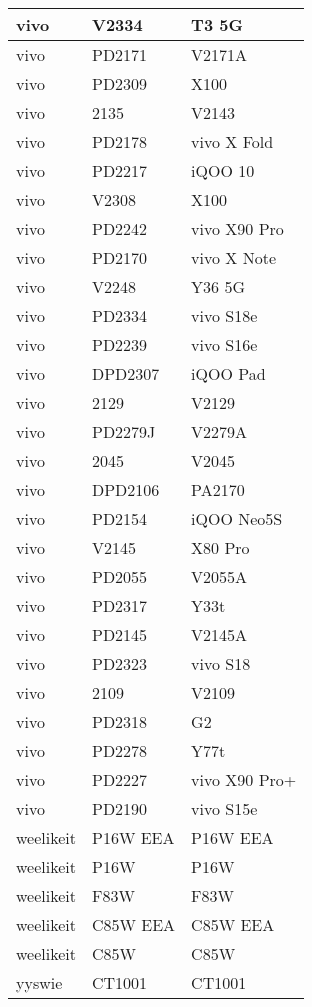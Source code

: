 \begin{tabularx}{\linewidth}{|l|X|X|}
        vivo & V2334 & T3 5G \\ \hline
        vivo & PD2171 & V2171A \\ \hline
        vivo & PD2309 & X100 \\ \hline
        vivo & 2135 & V2143 \\ \hline
        vivo & PD2178 & vivo X Fold \\ \hline
        vivo & PD2217 & iQOO 10 \\ \hline
        vivo & V2308 & X100 \\ \hline
        vivo & PD2242 & vivo X90 Pro \\ \hline
        vivo & PD2170 & vivo X Note \\ \hline
        vivo & V2248 & Y36 5G \\ \hline
        vivo & PD2334 & vivo S18e \\ \hline
        vivo & PD2239 & vivo S16e \\ \hline
        vivo & DPD2307 & iQOO Pad \\ \hline
        vivo & 2129 & V2129 \\ \hline
        vivo & PD2279J & V2279A \\ \hline
        vivo & 2045 & V2045 \\ \hline
        vivo & DPD2106 & PA2170 \\ \hline
        vivo & PD2154 & iQOO Neo5S \\ \hline
        vivo & V2145 & X80 Pro \\ \hline
        vivo & PD2055 & V2055A \\ \hline
        vivo & PD2317 & Y33t \\ \hline
        vivo & PD2145 & V2145A \\ \hline
        vivo & PD2323 & vivo S18 \\ \hline
        vivo & 2109 & V2109 \\ \hline
        vivo & PD2318 & G2 \\ \hline
        vivo & PD2278 & Y77t \\ \hline
        vivo & PD2227 & vivo X90 Pro+ \\ \hline
        vivo & PD2190 & vivo S15e \\ \hline
        weelikeit & P16W EEA & P16W EEA \\ \hline
        weelikeit & P16W & P16W \\ \hline
        weelikeit & F83W & F83W \\ \hline
        weelikeit & C85W EEA & C85W EEA \\ \hline
        weelikeit & C85W & C85W \\ \hline
        yyswie & CT1001 & CT1001 \\ \hline
\end{tabularx}